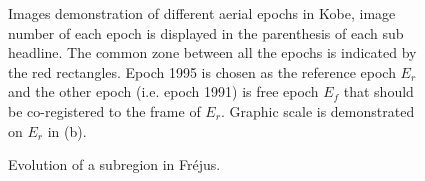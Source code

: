 \begin{figure}[htbp]
\begin{center}
{\begin{minipage}[t]{1\linewidth}
            \end{minipage}%
        }
        \caption{Images demonstration of different aerial epochs in Kobe, image number of each epoch is displayed in the parenthesis of each sub headline. The common zone between all the epochs is indicated by the red rectangles. Epoch 1995 is chosen as the reference epoch $E_r$ and the other epoch (i.e. epoch 1991) is free epoch $E_f$ that should be co-registered to the frame of $E_r$. Graphic scale is demonstrated on $E_r$ in (b).}
        \label{KobeData}
    \end{center}
\end{figure} 


\begin{figure}[htbp]
	\begin{center}
		\caption{Evolution of a subregion in Fr{\'e}jus.}
		\label{FrejusEvolution}
	\end{center}
\end{figure} 

